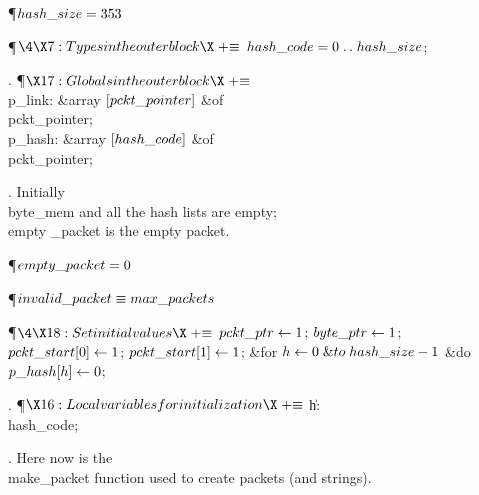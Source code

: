 \Y\P\D {}$\\{hash\_size}=353$\par
\Y\P$\4\X7:Types in the outer block\X\mathrel{+}\S$\6
$\\{hash\_code}=0\to\\{hash\_size}$;\par
\fi

. \P$\X17:Globals in the outer block\X\mathrel{+}\S$\6
\4\\{p\_link}: \&{array} $[\\{pckt\_pointer}]$ \1\&{of}\5
\\{pckt\_pointer};\2\6
\4\\{p\_hash}: \&{array} $[\\{hash\_code}]$ \1\&{of}\5
\\{pckt\_pointer};\2\par
\fi

. Initially \\{byte\_mem} and all the hash lists are empty; \\{empty%
\_packet}
is the empty packet.

\Y\P\D {}$\\{empty\_packet}=0$\par
\P\D {}$\\{invalid\_packet}\S\\{max\_packets}$%
\par
\Y\P$\4\X18:Set initial values\X\mathrel{+}\S$\6
$\\{pckt\_ptr}\K1$;\5
$\\{byte\_ptr}\K1$;\5
$\\{pckt\_start}[0]\K1$;\5
$\\{pckt\_start}[1]\K1$;\6
\&{for} $\|h\K0\mathrel{\&{to}}\\{hash\_size}-1$ \1\&{do}\5
$\\{p\_hash}[\|h]\K0$;\2\par
\fi

. \P$\X16:Local variables for initialization\X\mathrel{+}\S$\6
\4\|h: \\{hash\_code};\par
\fi

. Here now is the \\{make\_packet} function used to create packets (and
strings).

